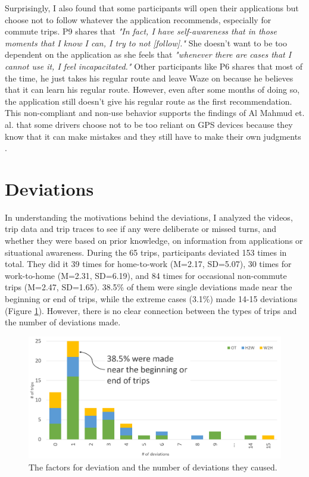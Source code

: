 Surprisingly, I also found that some participants will open their applications but choose not to follow whatever the application recommends, especially for commute trips. P9 shares that \emph{"In fact, I have self-awareness that in those moments that I know I can, I try to not [follow]."} She doesn't want to be too dependent on the application as she feels that \emph{"whenever there are cases that I cannot use it, I feel incapacitated."} Other participants like P6 shares that most of the time, he just takes his regular route and leave Waze on because he believes that it can learn his regular route. However, even after some months of doing so, the application still doesn't give his regular route as the first recommendation. This non-compliant and non-use behavior supports the findings of Al Mahmud et. al. that some drivers choose not to be too reliant on GPS devices because they know that it can make mistakes and they still have to make their own judgments \cite{Mahmud2009UserDrivers}. 

\section{Deviations}

In understanding the motivations behind the deviations, I analyzed the videos, trip data and trip traces to see if any were deliberate or missed turns, and whether they were based on prior knowledge, on information from applications or situational awareness. During the 65 trips, participants deviated 153 times in total. They did it 39 times for home-to-work (M=2.17, SD=5.07), 30 times for work-to-home (M=2.31, SD=6.19), and 84 times for occasional non-commute trips (M=2.47, SD=1.65). 38.5\% of them were single deviations made near the beginning or end of trips, while the extreme cases (3.1\%) made 14-15 deviations (Figure \ref{fig:s1-trips-vs-devs}). However, there is no clear connection between the types of trips and the number of deviations made. 

\begin{figure}[t]
  \centering
  \includegraphics[scale=0.4]{figures/s1-trips-vs-devs.png}
  \caption{The factors for deviation and the number of deviations they caused.}
  \label{fig:s1-trips-vs-devs}
\end{figure}

